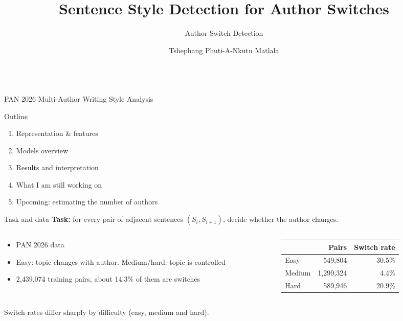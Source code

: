 \documentclass[aspectratio=169,11pt]{beamer}
\title{Sentence Style Detection for Author Switches}
\subtitle{Author Switch Detection}
\author{Tshephang Phuti-A-Nkutu Matlala}
\date{}
\begin{document}
\begin{frame}[plain]
\vspace{1.2cm}
{\Huge\bfseries\inserttitle\par}
\vspace{0.4cm}
{\Large\color{ink!80}\insertsubtitle\par}
\vspace{0.8cm}
{\large\insertauthor}\\[0.3em]
{\color{ink!70}PAN 2026 Multi-Author Writing Style Analysis}
\end{frame}

\begin{frame}{Outline}
\begin{enumerate}
\setlength\itemsep{0.7em}
\item Representation \& features
\item Models overview
\item Results and interpretation
\item What I am still working on
\item Upcoming: estimating the number of authors
\end{enumerate}
\end{frame}

\begin{frame}{Task and data}
\textbf{Task:} for every pair of adjacent sentences $(S_i,S_{i+1})$, decide whether the author changes.
\medskip
\begin{columns}[T]
\begin{column}{0.5\textwidth}
\begin{itemize}
\item PAN 2026 data
\item Easy: topic changes with author. Medium/hard: topic is controlled
\item 2,439,074 training pairs, about 14.3\% of them are switches
\end{itemize}
\end{column}
\begin{column}{0.5\textwidth}
\centering\small
\begin{tabular}{lrr}
\toprule
& \textbf{Pairs} & \textbf{Switch rate}\\
\midrule
Easy & 549,804 & 30.5\%\\
Medium & 1,299,324 & 4.4\%\\
Hard & 589,946 & 20.9\%\\
\bottomrule
\end{tabular}
\end{column}
\end{columns}
\medskip
\begin{block}{}
Switch rates differ sharply by difficulty (easy, medium and hard).
\end{block}
\end{frame}
\end{document}
